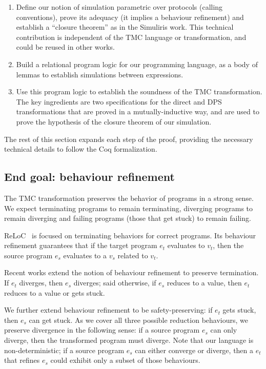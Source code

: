 \begin{enumerate}

\item Define our notion of simulation parametric over protocols (calling conventions), prove its adequacy (it implies a behaviour refinement) and establish a ``closure theorem'' as in the Simuliris work.
%
  This technical contribution is independent of the TMC language or transformation, and could be reused in other works.

\item Build a relational program logic for our programming language, as a body of lemmas to establish simulations between expressions.

\item Use this program logic to establish the soundness of the TMC transformation.
%
The key ingredients are two specifications for the direct and DPS transformations that are proved in a mutually-inductive way, and are used to prove the hypothesis of the closure theorem of our simulation.
\end{enumerate}

The rest of this section expands each step of the proof, providing the necessary technical details to follow the Coq formalization.

\subsection{End goal: behaviour refinement}

The TMC transformation preserves the behavior of programs in a strong sense.
%
We expect terminating programs to remain terminating, diverging programs to remain diverging and failing programs (those that get stuck) to remain failing.

ReLoC~\citep*{TODO-reloc} is focused on terminating behaviors for correct programs.
%
Its behaviour refinement guarantees that if the target program $e_t$ evaluates to $v_t$, then the source program $e_s$ evaluates to a $v_s$ related to $v_t$.

Recent works extend the notion of behaviour refinement to preserve termination.
%
If $e_t$ diverges, then $e_s$ diverges; said otherwise, if $e_s$ reduces to a value,
then $e_t$ reduces to a value or gets stuck.

We further extend behaviour refinement to be safety-preserving: if $e_t$ gets stuck, then $e_s$ can get stuck.
%
As we cover all three possible reduction behaviours, we preserve divergence in the following sense: if a source program $e_s$ can only diverge, then the transformed program must diverge.
%
Note that our language is non-deterministic; if a source program $e_s$ can either converge or diverge, then a $e_t$ that refines $e_s$ could exhibit only a subset of those behaviours.

